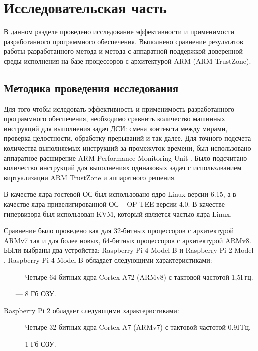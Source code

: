 \section{Исследовательская часть}

В данном разделе проведено исследование эффективности и применимости разработанного программного обеспечения. Выполнено сравнение результатов работы разработанного метода и метода с аппаратной поддержкой доверенной среды исполнения на базе процессоров с архитектурой ARM (ARM TrustZone).

\subsection{Методика проведения исследования}

Для того чтобы иследовать эффективность и применимость разработанного программного обеспечения, необходимо сравнить количество машинных инструкций для выполнения задач ДСИ: смена контекста между мирами, проверка целостности, обработку прерываний и так далее. Для точного подсчета количества выполняемых инструкций за промежуток времени, был использовано аппаратное расширение ARM Performance Monitoring Unit \cite{arm-performance-monitor}. Было подсчитано количество инструкций для выполнениях одинаковых задач с использлванием виртуализации ARM TrustZone и аппаратного решения.

В качестве ядра гостевой ОС был использовано ядро Linux версии 6.15, а в качестве ядра привелигированной ОС -- OP-TEE версии 4.0. В качестве гипервизора был использован KVM, который является частью ядра Linux.

Сравнение было проведено как для 32-битных процессоров с архитектурой ARMv7 так и для более новых, 64-битных процессоров с архитектурой ARMv8. БЫли выбраны два устройства: Raspberry Pi 4 Model B \cite{rpi4-b} и Raspberry Pi 2 Model \cite{rpi2-b}. Raspberry Pi 4 Model B обладает следующими характеристиками:

\begin{itemize}
	\item [---] Четыре 64-битных ядра Cortex A72 (ARMv8) с тактовой частотой 1,5Ггц.
	\item [---] 8 Гб ОЗУ.
\end{itemize}

Raspberry Pi 2 обладает следующими характеристиками:

\begin{itemize}
	\item [---] Четыре 32-битных ядра Cortex A7 (ARMv7) с тактовой частотой 0.9ГГц.
	\item [---] 1 Гб ОЗУ.
\end{itemize}

